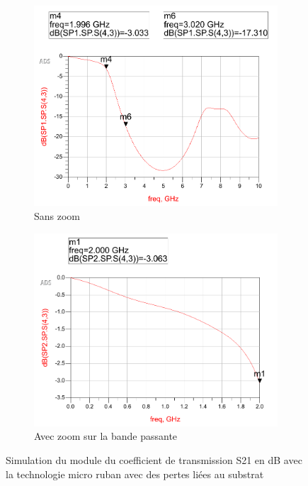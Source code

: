 \documentclass[french]{article}
\begin{document}
\begin{figure}[H]
	\centering
	\begin{subfigure}[b]{0.49\textwidth}
		\includegraphics[width=\textwidth]{photo/passe_bas_vic/simu_passe_bas_distribue_substrat_avec_perte.PNG}
		\caption{Sans zoom}
		\label{fig:simu_passe_bas_distribue_substrat_avec_perteG}
	\end{subfigure}
	\begin{subfigure}[b]{0.49\textwidth}
		\includegraphics[width=\textwidth]{photo/passe_bas_vic/simu_zoom_passe_bas_distribue_substrat_avec_perte.PNG}
		\caption{Avec zoom sur la bande passante}
		\label{fig:simu_zoom_passe_bas_distribue_substrat_avec_perte}
	\end{subfigure}
	\caption{Simulation du module du coefficient de transmission S21 en dB avec la technologie micro ruban avec des pertes liées au substrat}
	\label{fig:simu_passe_bas_distribue_substrat_avec_perte}
\end{figure}
\end{document}
